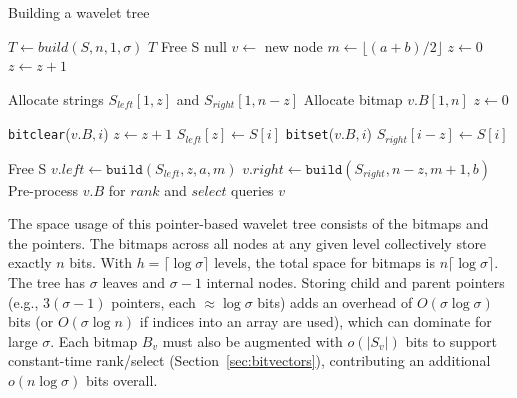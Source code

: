 \begin{algorithm}[ht!]
    \caption{Building a wavelet tree}\label{alg:build_wt}
    \begin{algorithmic}
        \State $T \gets build(S,n,1,\sigma)$
        \State \Return $T$
        \EndFunction
         
        \State Free S
        \State \Return null
        \EndIf
        \State $v \gets$ new node
        \State $m \gets \lfloor (a+b)/2 \rfloor$
        \State $z \gets 0$ 
        \State $z \gets z+1$
        \EndIf
        \EndFor

        \State Allocate strings $S_{left}[1,z]$ and $S_{right}[1,n-z]$
        \State Allocate bitmap $v.B[1,n]$
        \State $z \gets 0$

        \State \texttt{bitclear}($v.B,i$) 
        \State $z \gets z+1$
        \State $S_{left}[z] \gets S[i]$
        \Else
        \State \texttt{bitset}($v.B,i$) 
        \State $S_{right}[i-z] \gets S[i]$
        \EndIf
        \EndFor

        \State Free S
        \State $v.left \gets \texttt{build}(S_{left},z,a,m)$
        \State $v.right \gets \texttt{build}(S_{right},n-z,m+1,b)$
        \State Pre-process $v.B$ for $rank$ and $select$ queries
        \State \Return $v$
        \EndFunction
    \end{algorithmic}
\end{algorithm}

The space usage of this pointer-based wavelet tree consists of the bitmaps and the pointers. The bitmaps across all nodes at any given level collectively store exactly $n$ bits. With $h = \lceil \log \sigma \rceil$ levels, the total space for bitmaps is $n \lceil \log \sigma \rceil$. The tree has $\sigma$ leaves and $\sigma-1$ internal nodes. Storing child and parent pointers (e.g., $3(\sigma-1)$ pointers, each $\approx \log \sigma$ bits) adds an overhead of $O(\sigma \log \sigma)$ bits (or $O(\sigma \log n)$ if indices into an array are used), which can dominate for large $\sigma$. Each bitmap $B_v$ must also be augmented with $o(|S_v|)$ bits to support constant-time rank/select (Section~\ref{sec:bitvectors}), contributing an additional $o(n \log \sigma)$ bits overall.

